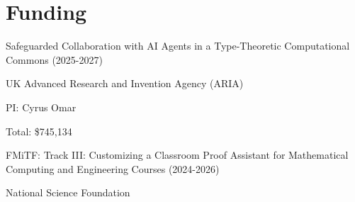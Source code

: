 \documentclass[10pt,letterpaper]{article}
\renewenvironment{itemize}{
  \begin{list}{}{
    \setlength{\leftmargin}{1.25em}
    \setlength{\itemsep}{0.25em}
    \setlength{\parskip}{0pt}
    \setlength{\parsep}{0.2em}
  }
}{
  \end{list}
}
\begin{document}
\section*{Funding}

\begin{itemize}
  \item Safeguarded Collaboration with AI Agents in a Type-Theoretic Computational Commons  (2025-2027)
    \begin{itemize}
      \item UK Advanced Research and Invention Agency (ARIA)
      \item PI: Cyrus Omar
      \item Total: \$745,134
    \end{itemize}
  \item FMiTF: Track III: Customizing a Classroom Proof Assistant for Mathematical Computing and Engineering Courses (2024-2026)
    \begin{itemize}
      \item National Science Foundation

\end{itemize}
\end{itemize}
\end{document}
